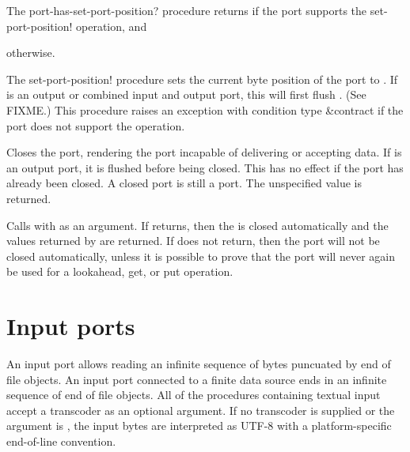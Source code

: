 \begin{entry}{%

   
The {\cf port-has-set-port-position?} procedure returns \schtrue{} if the port
supports the {\cf set-port-position!} operation, and \schfalse}
otherwise.
   
The {\cf set-port-position!} procedure sets the current byte position
of the port to .  If  is an output or combined
input and output port, this will first flush .  (See FIXME.)
This procedure raises an exception with condition type {\cf\&contract}
if the port does not support the operation.
\end{entry}

\begin{entry}{%
}
   
Closes the port, rendering the port incapable of delivering or
accepting data. If  is an output port, it is flushed before
being closed.  This has no effect if the port has already been closed.
A closed port is still a port. The unspecified value is returned.
\end{entry}

\begin{entry}{%
}
   
  Calls  with  as an argument. If
 returns, then the  is closed automatically and
the values returned by  are returned. If  does not
return, then the port will not be closed automatically, unless it is
possible to prove that the port will never again be used for a
{\cf lookahead}, {\cf get}, or {\cf put} operation.
\end{entry}

\section{Input ports}

An input port allows reading an infinite sequence of bytes puncuated
by end of file objects. An input port connected to a finite data
source ends in an infinite sequence of end of file objects.  All of
the procedures containing textual input accept a transcoder as an
optional argument. If no transcoder is supplied or the
 argument is \schfalse{}, the input bytes are
interpreted as UTF-8 with a platform-specific end-of-line convention.

